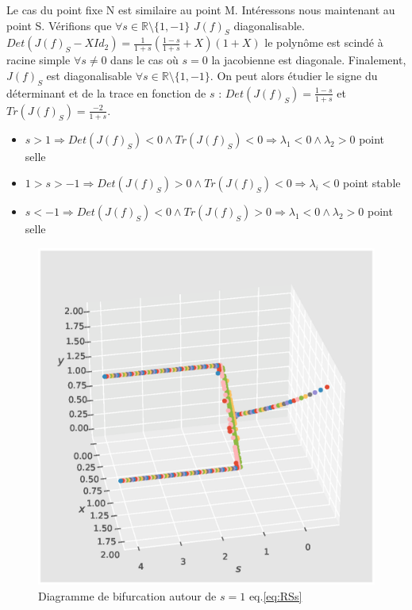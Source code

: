 \documentclass{wsdcr}
\begin{document}
Le cas du point fixe N est similaire au point M. Intéressons nous maintenant au point S. Vérifions que $\forall s \in \mathds{R}\setminus \{1,-1\}$ $J(f)_{S}$ diagonalisable.$Det(J(f)_{S}-XId_2)=\frac{1}{1+s}(\frac{1-s}{1+s}+X)(1+X)$ le polynôme est scindé à racine simple $\forall s \neq 0$ dans le cas où $s=0$ la jacobienne est diagonale. Finalement, $J(f)_{S}$ est diagonalisable $\forall s \in \mathds{R}\setminus \{1,-1\}$. On peut alors étudier le signe du déterminant et de la trace en fonction de $s$ : $Det(J(f)_{S})=\frac{1-s}{1+s}$ et $Tr(J(f)_{S})=\frac{-2}{1+s}$.
\begin{itemize}
	\item $s>1 \Rightarrow Det(J(f)_{S})<0 \land Tr(J(f)_{S})<0 \Rightarrow \lambda_1<0 \land \lambda_2>0$ {\color{red}point selle}
	\item $1>s>-1 \Rightarrow Det(J(f)_{S})>0 \land Tr(J(f)_{S})<0 \Rightarrow \lambda_i<0$ {\color{red}point stable}
	\item $s<-1 \Rightarrow Det(J(f)_{S})<0 \land Tr(J(f)_{S})>0 \Rightarrow \lambda_1<0 \land \lambda_2>0$ {\color{red}point selle}
\end{itemize}
\begin{figure}
    \centering
    \includegraphics[width=\linewidth]{fig/lv2_bif3Dx10.eps}
    \caption{Diagramme de bifurcation autour de $s=1$ eq.\ref{eq:RSs}}
    \label{fig:bif2}
\end{figure}
\end{document}
